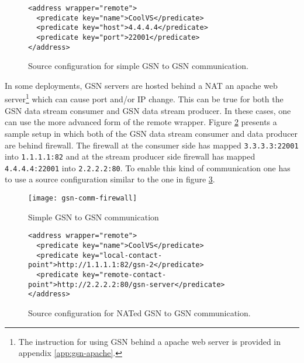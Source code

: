 \begin{figure}%
  \centering
  \lstset{numbers=left, numberstyle=\footnotesize}
\begin{lstlisting}
<address wrapper="remote">
  <predicate key="name">CoolVS</predicate>
  <predicate key="host">4.4.4.4</predicate>
  <predicate key="port">22001</predicate>
</address>        
\end{lstlisting}
  \caption{Source configuration for simple GSN to GSN communication.}
  \label{gsn2gsn-simple}
\end{figure}

In some deployments, GSN servers are hosted behind a NAT an apache web server\footnote{The instruction for using GSN behind a apache web server is provided in appendix \ref{app:gsn-apache}.} which can cause port and/or IP change. This can be true for both the GSN data stream consumer and GSN data stream producer.
In these cases, one can use the more advanced form of the remote wrapper. Figure \ref{gsn2gsn-nat-figure} presents a sample setup in which both of the GSN data stream
consumer and data producer are behind firewall. The firewall at the consumer side has mapped \texttt{3.3.3.3:22001} into \texttt{1.1.1.1:82} and at the stream producer side
firewall has mapped \texttt{4.4.4.4:22001} into \texttt{2.2.2.2:80}.  To enable this kind of
communication one has to use a source configuration similar to the one in figure \ref{gsn2gsn-nat}.


\begin{figure}%
  \centering
  \texttt{[image: gsn-comm-firewall]}
  \caption{Simple GSN to GSN communication}
  \label{gsn2gsn-nat-figure}
\end{figure}

\begin{figure}%
  \centering
  \lstset{numbers=left, numberstyle=\footnotesize,basicstyle=\small}
\begin{lstlisting}
<address wrapper="remote">
  <predicate key="name">CoolVS</predicate>
  <predicate key="local-contact-point">http://1.1.1.1:82/gsn-2</predicate>
  <predicate key="remote-contact-point">http://2.2.2.2:80/gsn-server</predicate>
</address>        
\end{lstlisting}
  \caption{Source configuration for NATed GSN to GSN communication.}
  \label{gsn2gsn-nat}
\end{figure}

